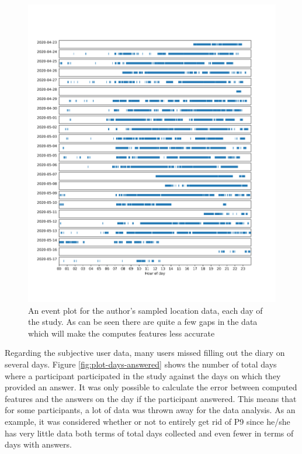 \begin{figure}[h]
    \centering
    \includegraphics[width=\textwidth]{images/study/thomas-gaps.png}
    \caption{An event plot for the author's sampled location data, each day of the study. As can be seen there are quite a few gaps in the data which will make the computes features less accurate}
    \label{fig:plot-gaps-data}
\end{figure}

Regarding the subjective user data, many users missed filling out the diary on several days. Figure \ref{fig:plot-days-answered} shows the number of total days where a participant participated in the study against the days on which they provided an answer. It was only possible to calculate the error between computed features and the answers on the day if the participant answered. This means that for some participants, a lot of data was thrown away for the data analysis. As an example, it was considered whether or not to entirely get rid of P9 since he/she has very little data both terms of total days collected and even fewer in terms of days with answers. \\

